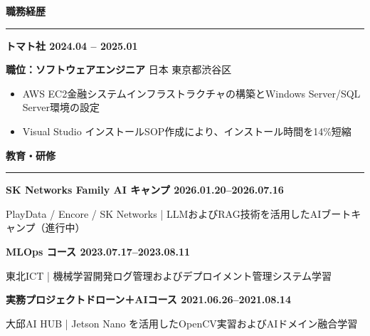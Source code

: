 \documentclass[a4paper, 10pt]{article}
\newcommand{\resumesection}[1]{%
  \vspace{8pt}
  \noindent
  {\large\bfseries #1}
  \vspace{2pt}
  \noindent\hrule
  \vspace{4pt}
}
\begin{document}

\resumesection{\japanesefont 職務経歴}

\vspace{2pt}
\noindent
\textbf{\japanesefont トマト社 \hfill 2024.04 -- 2025.01}

\noindent
\textbf{\quad \japanesefont 職位：ソフトウェアエンジニア} \hfill \japanesefont 日本 東京都渋谷区

\begin{itemize}
  \setlength{\itemsep}{1pt}
  \setlength{\parskip}{0pt}
  \item \japanesefont AWS EC2金融システムインフラストラクチャの構築とWindows Server/SQL Server環境の設定
  \item \japanesefont Visual Studio インストールSOP作成により、インストール時間を14\%短縮
\end{itemize}


\resumesection{\japanesefont 教育・研修}

\vspace{2pt}
\noindent
\textbf{\japanesefont SK Networks Family AI キャンプ \hfill 2026.01.20--2026.07.16}

\noindent
{\small \japanesefont PlayData / Encore / SK Networks | LLMおよびRAG技術を活用したAIブートキャンプ（進行中）}

\vspace{3pt}
\noindent
\textbf{\japanesefont MLOps コース \hfill 2023.07.17--2023.08.11}

\noindent
{\small \japanesefont 東北ICT | 機械学習開発ログ管理およびデプロイメント管理システム学習}

\vspace{3pt}
\noindent
\textbf{\japanesefont 実務プロジェクトドローン＋AIコース \hfill 2021.06.26--2021.08.14}

\noindent
{\small \japanesefont 大邱AI HUB | Jetson Nano を活用したOpenCV実習およびAIドメイン融合学習}

\end{document}
